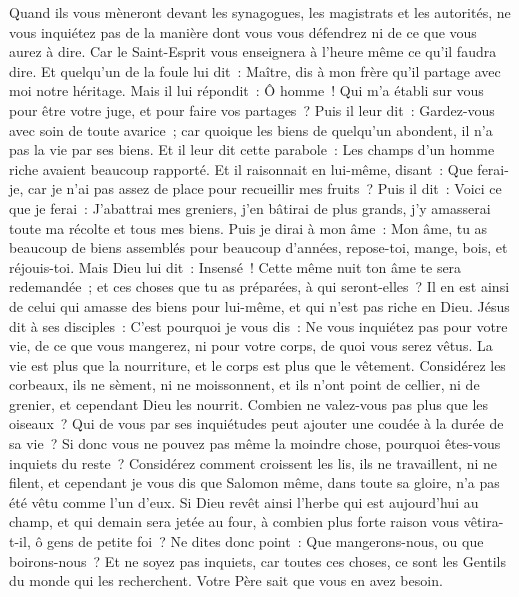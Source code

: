 \begin{multicols}{2}
Quand ils vous mèneront devant les synagogues, les magistrats et les autorités, ne vous inquiétez pas de la manière dont vous vous défendrez ni de ce que vous aurez à dire.
Car le Saint-Esprit vous enseignera à l'heure même ce qu'il faudra dire.
Et quelqu'un de la foule lui dit~: Maître, dis à mon frère qu'il partage avec moi notre héritage.
Mais il lui répondit~: Ô homme~! Qui m'a établi sur vous pour être votre juge, et pour faire vos partages~?
Puis il leur dit~: Gardez-vous avec soin de toute avarice~; car quoique les biens de quelqu'un abondent, il n'a pas la vie par ses biens.
Et il leur dit cette parabole~: Les champs d'un homme riche avaient beaucoup rapporté.
Et il raisonnait en lui-même, disant~: Que ferai-je, car je n'ai pas assez de place pour recueillir mes fruits~?
Puis il dit~: Voici ce que je ferai~: J'abattrai mes greniers, j'en bâtirai de plus grands, j'y amasserai toute ma récolte et tous mes biens.
Puis je dirai à mon âme~: Mon âme, tu as beaucoup de biens assemblés pour beaucoup d'années, repose-toi, mange, bois, et réjouis-toi.
Mais Dieu lui dit~: Insensé~! Cette même nuit ton âme te sera redemandée~; et ces choses que tu as préparées, à qui seront-elles~?
Il en est ainsi de celui qui amasse des biens pour lui-même, et qui n'est pas riche en Dieu.
Jésus dit à ses disciples~: C'est pourquoi je vous dis~: Ne vous inquiétez pas pour votre vie, de ce que vous mangerez, ni pour votre corps, de quoi vous serez vêtus.
La vie est plus que la nourriture, et le corps est plus que le vêtement.
Considérez les corbeaux, ils ne sèment, ni ne moissonnent, et ils n'ont point de cellier, ni de grenier, et cependant Dieu les nourrit. Combien ne valez-vous pas plus que les oiseaux~?
Qui de vous par ses inquiétudes peut ajouter une coudée à la durée de sa vie~?
Si donc vous ne pouvez pas même la moindre chose, pourquoi êtes-vous inquiets du reste~?
Considérez comment croissent les lis, ils ne travaillent, ni ne filent, et cependant je vous dis que Salomon même, dans toute sa gloire, n'a pas été vêtu comme l'un d'eux.
Si Dieu revêt ainsi l'herbe qui est aujourd'hui au champ, et qui demain sera jetée au four, à combien plus forte raison vous vêtira-t-il, ô gens de petite foi~?
Ne dites donc point~: Que mangerons-nous, ou que boirons-nous~? Et ne soyez pas inquiets,
car toutes ces choses, ce sont les Gentils du monde qui les recherchent. Votre Père sait que vous en avez besoin.

\end{multicols}
